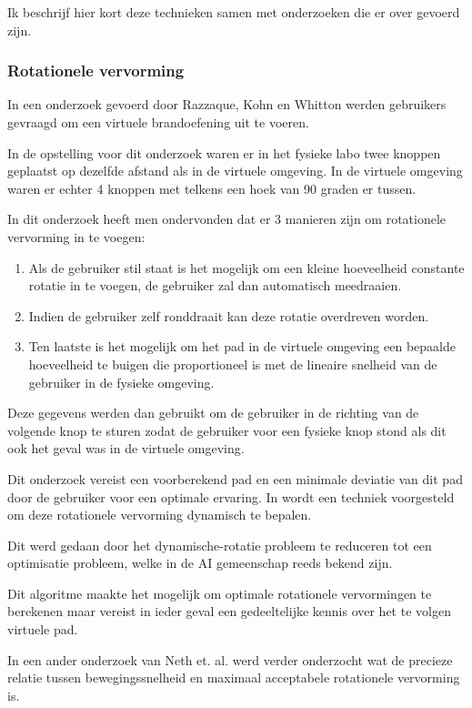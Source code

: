 \documentclass[a4paper,12pt]{article}
\begin{document}
Ik beschrijf hier kort deze technieken samen met onderzoeken die er over gevoerd
zijn.


\subsubsection{Rotationele vervorming}
In een onderzoek gevoerd door Razzaque, Kohn en Whitton \cite{kohn01} werden 
gebruikers gevraagd om een virtuele brandoefening uit te voeren.

In de opstelling voor dit onderzoek waren er in het fysieke labo twee knoppen
geplaatst op dezelfde afstand als in de virtuele omgeving. In de virtuele
omgeving waren er echter 4 knoppen met telkens een hoek van 90 graden er tussen.

In dit onderzoek heeft men ondervonden dat er 3 manieren zijn om rotationele
vervorming in te voegen:

\begin{enumerate}
    \item Als de gebruiker stil staat is het mogelijk om een kleine hoeveelheid
        constante rotatie in te voegen, de gebruiker zal dan automatisch
        meedraaien.
    \item Indien de gebruiker zelf ronddraait kan deze rotatie overdreven worden.
    \item Ten laatste is het mogelijk om het pad in de virtuele omgeving een
        bepaalde hoeveelheid te buigen die proportioneel is met de lineaire
        snelheid van de gebruiker in de fysieke omgeving.
\end{enumerate}

Deze gegevens werden dan gebruikt om de gebruiker in de richting van de volgende
knop te sturen zodat de gebruiker voor een fysieke knop stond als dit ook het
geval was in de virtuele omgeving.

Dit onderzoek vereist een voorberekend pad en een minimale deviatie van dit pad 
door de gebruiker voor een optimale ervaring. In \cite{engel08} wordt een 
techniek voorgesteld om deze rotationele vervorming dynamisch te bepalen.

Dit werd gedaan door het dynamische-rotatie probleem te reduceren tot een 
optimisatie probleem, welke in de AI gemeenschap reeds bekend zijn.

Dit algoritme maakte het mogelijk om optimale rotationele vervormingen te 
berekenen maar vereist in ieder geval een gedeeltelijke kennis over het te volgen
virtuele pad.

In een ander onderzoek van Neth et. al. \cite{neth12} werd verder onderzocht wat
de precieze relatie tussen bewegingssnelheid en maximaal acceptabele rotationele
vervorming is.
\end{document}

